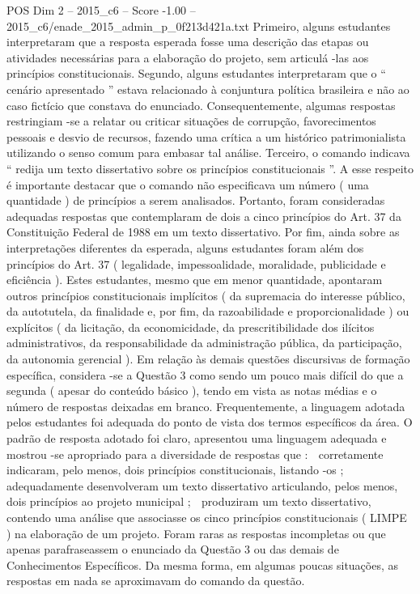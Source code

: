 \begin{textsample}{POS Dim 2 – 2015\_c6 – Score -1.00 – 2015\_c6/enade\_2015\_admin\_p\_0f213d421a.txt}
Primeiro, alguns estudantes interpretaram que a resposta esperada fosse uma descrição das etapas ou atividades necessárias para a elaboração do projeto, sem articulá -las aos princípios constitucionais.
Segundo, alguns estudantes interpretaram que o “ cenário apresentado ” estava relacionado à conjuntura política brasileira e não ao caso fictício que constava do enunciado.
Consequentemente, algumas respostas restringiam -se a relatar ou criticar situações de corrupção, favorecimentos pessoais e desvio de recursos, fazendo uma crítica a um histórico patrimonialista utilizando o senso comum para embasar tal análise.
Terceiro, o comando indicava “ redija um texto dissertativo sobre os princípios constitucionais ”.
A esse respeito é importante destacar que o comando não especificava um número ( uma quantidade ) de princípios a serem analisados.
Portanto, foram consideradas adequadas respostas que contemplaram de dois a cinco princípios do Art. 37 da Constituição Federal de 1988 em um texto dissertativo.
Por fim, ainda sobre as interpretações diferentes da esperada, alguns estudantes foram além dos princípios do Art. 37 ( legalidade, impessoalidade, moralidade, publicidade e eficiência ).
Estes estudantes, mesmo que em menor quantidade, apontaram outros princípios constitucionais implícitos ( da supremacia do interesse público, da autotutela, da finalidade e, por fim, da razoabilidade e proporcionalidade ) ou explícitos ( da licitação, da economicidade, da prescritibilidade dos ilícitos administrativos, da responsabilidade da administração pública, da participação, da autonomia gerencial ).
Em relação às demais questões discursivas de formação específica, considera -se a Questão 3 como sendo um pouco mais difícil do que a segunda ( apesar do conteúdo básico ), tendo em vista as notas médias e o número de respostas deixadas em branco.
Frequentemente, a linguagem adotada pelos estudantes foi adequada do ponto de vista dos termos específicos da área.
O padrão de resposta adotado foi claro, apresentou uma linguagem adequada e mostrou -se apropriado para a diversidade de respostas que :  corretamente indicaram, pelo menos, dois princípios constitucionais, listando -os ;  adequadamente desenvolveram um texto dissertativo articulando, pelos menos, dois princípios ao projeto municipal ;  produziram um texto dissertativo, contendo uma análise que associasse os cinco princípios constitucionais ( LIMPE ) na elaboração de um projeto.
Foram raras as respostas incompletas ou que apenas parafraseassem o enunciado da Questão 3 ou das demais de Conhecimentos Específicos.
Da mesma forma, em algumas poucas situações, as respostas em nada se aproximavam do comando da questão.

\end{textsample}

